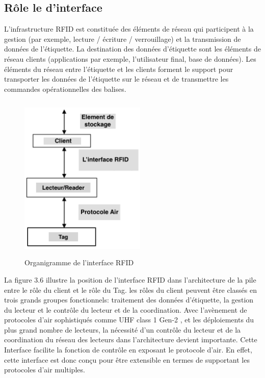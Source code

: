 \documentclass[11pt, a4paper, twoside]{book}
\begin{document}
\subsection{Rôle le d'interface}
L'infrastructure RFID est constituée des éléments de réseau qui participent à la gestion (par exemple, lecture / écriture / verrouillage) et la transmission de données de l'étiquette. La destination des données d'étiquette sont les éléments de réseau clients (applications par exemple, l'utilisateur final, base de données). Les éléments du réseau entre l'étiquette et les clients forment le support pour transporter les données de l'étiquette sur le réseau et de transmettre les commandes opérationnelles des balises.
\begin{figure}[H]
\centering
\includegraphics[width=6cm,height=8cm]{orga}
\caption{Organigramme de l'interface RFID}
\end{figure}

La figure 3.6 illustre la position de l'interface RFID dans l'architecture de la pile entre le  rôle  du client  et le rôle du Tag. les rôles du client peuvent être classés en trois grands groupes fonctionnels: traitement des données d'étiquette, la gestion du lecteur  et le contrôle du lecteur et de la coordination. Avec l'avènement de protocoles d'air sophistiqués comme UHF class 1 Gen-2 \cite{air}, et les déploiements du plus grand nombre de lecteurs, la nécessité d'un contrôle du lecteur et de la coordination  du réseau des lecteurs dans l'architecture devient importante. Cette Interface  facilite la fonction de contrôle en exposant le protocole d'air. En effet, cette interface est donc conçu pour être extensible en termes de supportant les protocoles d'air multiples.\\
\end{document}
